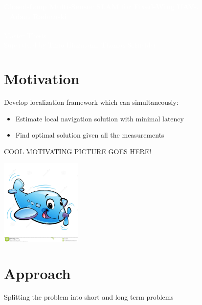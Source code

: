 \documentclass[%
    fourtothree=true, %
    DepLogo=true     %
    ]{ETHpres}
\newcommand*{\ETHtitle}{Closed-Loop Multi-Sensor SLAM for Fixed-Wing UAVs.}
\newcommand*{\ETHauthor}{Adam Radomski}
\begin{document}
\ETHtitelbild\textcolor{white}{\large\textbf{\ETHtitle}}\\~\newline\hspace{6mm}\normalsize%
\textcolor{white}{
\textbf{\ETHauthor}\\ \\
Master Thesis\\
Supervised by Timo Hinzmann, Thomas Schneider}\\


\ETHslide
\section*{Motivation}
Develop localization framework which can simultaneously:
\begin{itemize}
	\item[\ETHitem] Estimate local navigation solution with minimal latency
	\item[\ETHitem] Find optimal solution given all the measurements
\end{itemize}
COOL MOTIVATING PICTURE GOES HERE!
\begin{center}
\includegraphics[width=0.3\textwidth]{pictures/cartoon-plane.jpg}\\
\end{center}

\clearpage

\ETHslide
\section*{Approach}
Splitting the problem into short and long term problems
\end{document}

